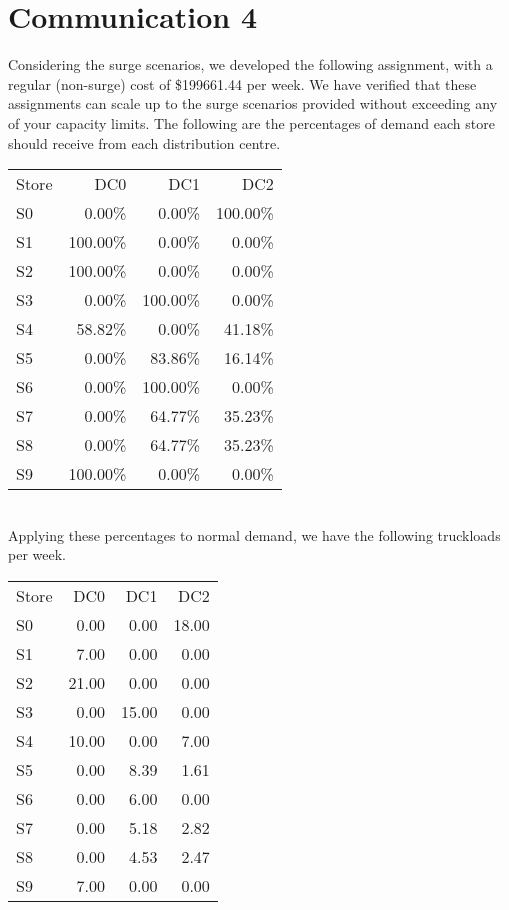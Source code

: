 \documentclass[11pt,a4paper]{article}
\begin{document}
\section{Communication 4}
Considering the surge scenarios, we developed the following assignment, with a 
regular (non-surge) cost of \$199661.44 per week.
We have verified that these assignments can scale up to the surge scenarios provided
without exceeding any of your capacity limits.
The following are the percentages of demand each store should receive 
from each distribution centre. \\[0.8em]
\begin{tabular}{l r r r}
    Store & DC0 & DC1 & DC2 \\
S0 & 0.00\% & 0.00\% & 100.00\% \\
S1 & 100.00\% & 0.00\% & 0.00\% \\
S2 & 100.00\% & 0.00\% & 0.00\% \\
S3 & 0.00\% & 100.00\% & 0.00\% \\
S4 & 58.82\% & 0.00\% & 41.18\% \\
S5 & 0.00\% & 83.86\% & 16.14\% \\
S6 & 0.00\% & 100.00\% & 0.00\% \\
S7 & 0.00\% & 64.77\% & 35.23\% \\
S8 & 0.00\% & 64.77\% & 35.23\% \\
S9 & 100.00\% & 0.00\% & 0.00\% \\
\end{tabular}\\
Applying these percentages to normal demand, we have the following truckloads per 
week. \\[0.8em]
\begin{tabular}{l r r r }
    Store & DC0 & DC1 & DC2 \\
S0 & 0.00 & 0.00 & 18.00 \\
S1 & 7.00 & 0.00 & 0.00 \\
S2 & 21.00 & 0.00 & 0.00 \\
S3 & 0.00 & 15.00 & 0.00 \\
S4 & 10.00 & 0.00 & 7.00 \\
S5 & 0.00 & 8.39 & 1.61 \\
S6 & 0.00 & 6.00 & 0.00 \\
S7 & 0.00 & 5.18 & 2.82 \\
S8 & 0.00 & 4.53 & 2.47 \\
S9 & 7.00 & 0.00 & 0.00 \\
\end{tabular}
\end{document}
